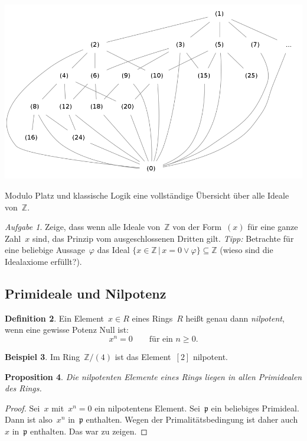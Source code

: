 \documentclass[a4paper,ngerman,12pt]{scrartcl}
\theoremstyle{definition}
\newtheorem{defn}{Definition}[section]
\newtheorem{bsp}[defn]{Beispiel}
\theoremstyle{plain}
\newtheorem{prop}[defn]{Proposition}
\theoremstyle{remark}
\newtheorem{aufg}[defn]{Aufgabe}
\newcommand{\ZZ}{\mathbb{Z}}
\newcommand{\pp}{\mathfrak{p}}
\renewcommand{\_}{\mathpunct{.}\,}
\newcommand{\?}{\,{:}\,}
\begin{document}
\begin{table}
  \centering
  \includegraphics[scale=0.4]{ideale-z}
  \caption{\label{ideale:z}Modulo Platz und klassische Logik eine
  vollständige Übersicht über alle Ideale von~$\ZZ$.}
\end{table}

\begin{aufg}Zeige, dass wenn alle Ideale von~$\ZZ$ von der Form~$(x)$ für
eine ganze Zahl~$x$ sind, das Prinzip vom ausgeschlossenen Dritten gilt.
\emph{Tipp:} Betrachte für eine beliebige Aussage~$\varphi$ das Ideal
$\{ x \in \ZZ \,|\, x = 0 \vee \varphi \} \subseteq \ZZ$ (wieso
sind die Idealaxiome erfüllt?).\end{aufg}


\subsection{Primideale und Nilpotenz}

\begin{defn}Ein Element~$x \in R$ eines Rings~$R$ heißt genau dann
\emph{nilpotent}, wenn eine gewisse Potenz Null ist:
\[ x^n = 0 \qquad\text{für ein~$n \geq 0$}. \]
\end{defn}

\begin{bsp}Im Ring~$\ZZ/(4)$ ist das Element~$[2]$ nilpotent.\end{bsp}

\begin{prop}Die nilpotenten Elemente eines Rings liegen in allen Primidealen
des Rings.\end{prop}
\begin{proof}Sei~$x$ mit~$x^n = 0$ ein nilpotentens Element. Sei~$\pp$ ein
beliebiges Primideal. Dann ist also~$x^n$ in~$\pp$ enthalten. Wegen der
Primalitätsbedingung ist daher auch~$x$ in~$\pp$ enthalten. Das war zu
zeigen.\end{proof}
\end{document}
